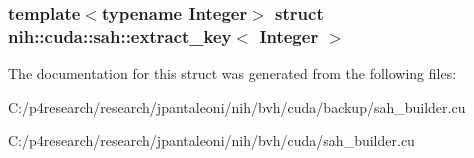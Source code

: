 \subsubsection*{template$<$typename Integer$>$ struct nih\-::cuda\-::sah\-::extract\-\_\-key$<$ Integer $>$}



\-The documentation for this struct was generated from the following files\-:\begin{DoxyCompactItemize}
\item 
\-C\-:/p4research/research/jpantaleoni/nih/bvh/cuda/backup/sah\-\_\-builder.\-cu\item 
\-C\-:/p4research/research/jpantaleoni/nih/bvh/cuda/sah\-\_\-builder.\-cu\end{DoxyCompactItemize}
